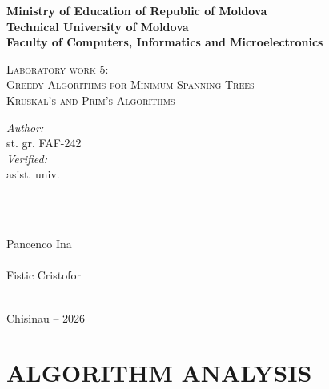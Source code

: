﻿\documentclass[12pt]{article}
\begin{document}
\begin{titlepage}
   \thispagestyle{empty}
   \begin{center}
    \textbf{\large Ministry of Education of Republic of Moldova}\\[0.1cm]
    \textbf{\large Technical University of Moldova}\\[0.1cm]
    \textbf{\large Faculty of Computers, Informatics and Microelectronics}\\[1.2cm]

    \vspace{45mm}

    \textsc{\Large Laboratory work 5:}\\[0.1cm]
    \textsc{\Large Greedy Algorithms for Minimum Spanning Trees}\\[0.1cm]
    \textsc{\large Kruskal's and Prim's Algorithms}\\[0.4cm]

    \vspace{70mm}

    \begin{minipage}[t]{0.4\textwidth}
    \begin{flushleft} \large
    \emph{Author:} \\
    st. gr. FAF-242 \\
    \emph{Verified:} \\
    asist. univ. \\
    \end{flushleft}
    \end{minipage}
    ~
    \begin{minipage}[t]{0.4\textwidth}
    \begin{flushright} \large
    \emph{} \\
    Pancenco Ina \\
    \emph{} \\
    Fistic Cristofor
    \end{flushright}
    \end{minipage}\\[3cm]

    \vspace{4mm}
    \large Chisinau -- 2026\\[0.5cm]

    \vfill
    \end{center}
\end{titlepage}

\clearpage
\thispagestyle{empty}
\tableofcontents

\clearpage
{}
\section{ALGORITHM ANALYSIS}
\end{document}
